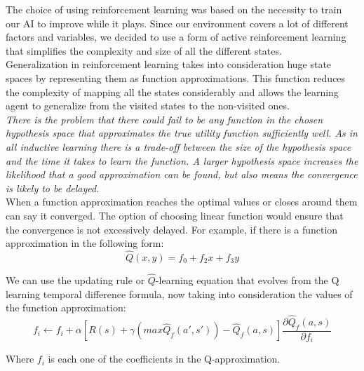 The choice of using reinforcement learning was based on the necessity to train our AI to improve while it plays. Since our environment covers a lot of different factors and variables, we decided to use a form of active reinforcement learning that simplifies the complexity and size of all the different states. \\

Generalization in reinforcement learning takes into consideration huge state spaces by representing them as function approximations. This function reduces the complexity of mapping all the states considerably and allows the learning agent to generalize from the visited states to the non-visited ones.\\

\textit{There is the problem that there could fail to be any function in the chosen hypothesis space that approximates the true utility function sufficiently well. As in all inductive learning there is a trade-off between the size of the hypothesis space and the time it takes to learn the function. A larger hypothesis space increases the likelihood that a good approximation can be found, but also means the convergence is likely to be delayed.}\cite[p778]{rl}\\

When a function approximation reaches the optimal values or closes around them can say it converged. The option of choosing linear function would ensure that the convergence is not excessively delayed. For example, if there is a function approximation in the following form:\\

\begin{equation}
\hat{Q}(x,y) = f_0 + f_2 x + f_3 y
\end{equation}

We can use the updating rule or $\hat{Q}$-learning equation that evolves from the Q learning temporal difference formula, now taking into consideration the values of the function approximation:  \cite{rl} \\ 
 
\begin{equation}
f_i \leftarrow f_i + \alpha [ R(s) + \gamma(max\hat{Q}_f(a',s'))-\hat{Q}_f(a,s) ] \frac{\partial \hat{Q}_f(a,s)}{\partial f_i}
\end{equation}

\begin{flushleft}
Where $f_i$ is each one of the coefficients in the Q-approximation.
\end{flushleft} 

